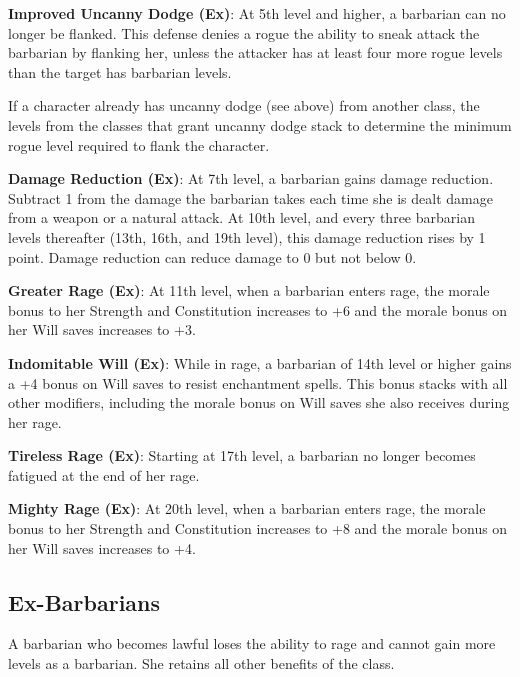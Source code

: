 \textbf{Improved Uncanny Dodge (Ex)}: At 5th level and higher, a barbarian can no longer be flanked. This defense denies a rogue the ability to sneak attack the barbarian by flanking her, unless the attacker has at least four more rogue levels than the target has barbarian levels.
				
If a character already has uncanny dodge (see above) from another class, the levels from the classes that grant uncanny dodge stack to determine the minimum rogue level required to flank the character.
				
\textbf{Damage Reduction (Ex)}: At 7th level, a barbarian gains damage reduction. Subtract 1 from the damage the barbarian takes each time she is dealt damage from a weapon or a natural attack. At 10th level, and every three barbarian levels thereafter (13th, 16th, and 19th level), this damage reduction rises by 1 point. Damage reduction can reduce damage to 0 but not below 0.
				
\textbf{Greater Rage (Ex)}: At 11th level, when a barbarian enters rage, the morale bonus to her Strength and Constitution increases to +6 and the morale bonus on her Will saves increases to +3.
				
\textbf{Indomitable Will (Ex)}: While in rage, a barbarian of 14th level or higher gains a +4 bonus on Will saves to resist enchantment spells. This bonus stacks with all other modifiers, including the morale bonus on Will saves she also receives during her rage.
				
\textbf{Tireless Rage (Ex)}: Starting at 17th level, a barbarian no longer becomes fatigued at the end of her rage.
				
\textbf{Mighty Rage (Ex)}: At 20th level, when a barbarian enters rage, the morale bonus to her Strength and Constitution increases to +8 and the morale bonus on her Will saves increases to +4.
				
\subsection{Ex-Barbarians}

				
A barbarian who becomes lawful loses the ability to rage and cannot gain more levels as a barbarian. She retains all other benefits of the class.
        	
